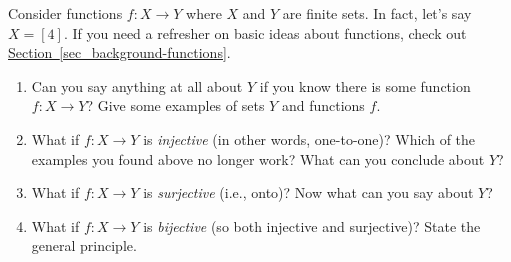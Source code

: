 \documentclass{book}
\begin{document}
\setcounter{project}{69}
\addtocounter{project}{-1}
\begin{activity}[]\label{activity-62}
\hypertarget{p-540}{}%
Consider functions \(f:X \to Y\) where \(X\) and \(Y\) are finite sets.  In fact, let's say \(X = [4]\). If you need a refresher on basic ideas about functions, check out \hyperref[sec_background-functions]{Section~\ref{sec_background-functions}}.%
\begin{enumerate}[font=\bfseries,label=(\alph*),ref=\alph*]
\item\label{task-94} \hypertarget{p-541}{}%
Can you say anything at all about \(Y\) if you know there is some function \(f:X \to Y\)?  Give some examples of sets \(Y\) and functions \(f\).%
\item\label{task-95} \hypertarget{p-542}{}%
What if \(f:X \to Y\) is \emph{injective} (in other words, one-to-one)?  Which of the examples you found above no longer work?  What can you conclude about \(Y\)?%
\item\label{task-96} \hypertarget{p-543}{}%
What if \(f:X \to Y\) is \emph{surjective} (i.e., onto)?  Now what can you say about \(Y\)?%
\item\label{task-97} \hypertarget{p-544}{}%
What if \(f:X\to Y\) is \emph{bijective} (so both injective and surjective)?  State the general principle.%
\end{enumerate}
\end{activity}
\end{document}
